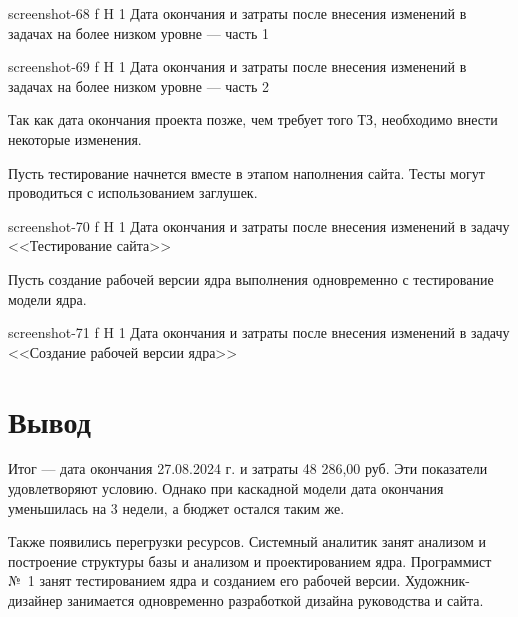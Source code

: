 \documentclass{bmstu}
\begin{document}
    {screenshot-68}
    {f}
    {H}
    {1\textwidth}
    {Дата окончания и затраты после внесения изменений в задачах на более низком уровне --- часть 1}
    
    {screenshot-69}
    {f}
    {H}
    {1\textwidth}
    {Дата окончания и затраты после внесения изменений в задачах на более низком уровне --- часть 2}
   
Так как дата окончания проекта позже, чем требует того ТЗ, необходимо внести некоторые изменения.
    
Пусть тестирование начнется вместе в этапом наполнения сайта. 
Тесты могут проводиться с использованием заглушек.    
    
    {screenshot-70}
    {f}
    {H}
    {1\textwidth}
    {Дата окончания и затраты после внесения изменений в задачу <<Тестирование сайта>>}
    
Пусть создание рабочей версии ядра выполнения одновременно с тестирование модели ядра.
    
    {screenshot-71}
    {f}
    {H}
    {1\textwidth}
    {Дата окончания и затраты после внесения изменений в задачу <<Создание рабочей версии ядра>>}
    
\section{Вывод}

Итог --- дата окончания 27.08.2024 г. и затраты 48 286,00 руб. 
Эти показатели удовлетворяют условию. 
Однако при каскадной модели дата окончания уменьшилась на 3 недели, а бюджет остался таким же.

Также появились перегрузки ресурсов. 
Системный аналитик занят анализом и построение структуры базы и анализом и проектированием ядра. 
Программист №~1 занят тестированием ядра и созданием его рабочей версии. 
Художник-дизайнер занимается одновременно разработкой дизайна руководства и сайта.
\end{document}
